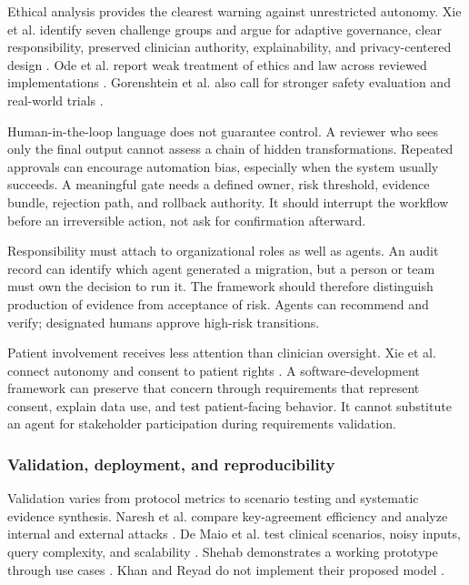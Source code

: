 \documentclass[11pt,a4paper]{article}
\begin{document}
Ethical analysis provides the clearest warning against unrestricted autonomy. Xie et al. identify seven challenge groups and argue for adaptive governance, clear responsibility, preserved clinician authority, explainability, and privacy-centered design \cite[pp.~5--13]{xie2026ethical}. Ode et al. report weak treatment of ethics and law across reviewed implementations \cite[pp.~4--7]{ode2025evidence}. Gorenshtein et al. also call for stronger safety evaluation and real-world trials \cite[pp.~20--24]{gorenshtein2025clinical}.

Human-in-the-loop language does not guarantee control. A reviewer who sees only the final output cannot assess a chain of hidden transformations. Repeated approvals can encourage automation bias, especially when the system usually succeeds. A meaningful gate needs a defined owner, risk threshold, evidence bundle, rejection path, and rollback authority. It should interrupt the workflow before an irreversible action, not ask for confirmation afterward.

Responsibility must attach to organizational roles as well as agents. An audit record can identify which agent generated a migration, but a person or team must own the decision to run it. The framework should therefore distinguish production of evidence from acceptance of risk. Agents can recommend and verify; designated humans approve high-risk transitions.

Patient involvement receives less attention than clinician oversight. Xie et al. connect autonomy and consent to patient rights \cite[pp.~8--10]{xie2026ethical}. A software-development framework can preserve that concern through requirements that represent consent, explain data use, and test patient-facing behavior. It cannot substitute an agent for stakeholder participation during requirements validation.

\subsubsection{Validation, deployment, and reproducibility}

Validation varies from protocol metrics to scenario testing and systematic evidence synthesis. Naresh et al. compare key-agreement efficiency and analyze internal and external attacks \cite[pp.~15--20]{naresh2020quantum}. De Maio et al. test clinical scenarios, noisy inputs, query complexity, and scalability \cite[pp.~6--8]{demaio2025privacy}. Shehab demonstrates a working prototype through use cases \cite[pp.~3--5]{shehab2025agentic}. Khan and Reyad do not implement their proposed model \cite[p.~5]{khan2019ibac}.
\end{document}
